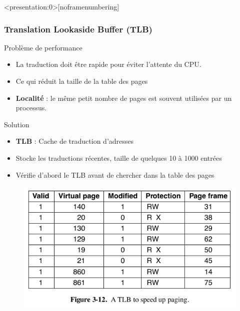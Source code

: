 \documentclass[8pt]{beamer}
\begin{document}
\begin{frame}<presentation:0>[noframenumbering]
    \frametitle{Translation Lookaside Buffer (TLB)}

    \begin{alertblock}{Problème de performance}
        \begin{itemize}
            \item La traduction doit \^etre rapide pour \'eviter
                  l'attente du
                  CPU.
            \item Ce qui r\'eduit la taille de la table des pages
            \item \textbf{Localité} : le même petit nombre de pages est souvent
                  utilisées par un processus.
        \end{itemize}
    \end{alertblock}
    \begin{exampleblock}{Solution}
        \begin{itemize}
            \item \textbf{TLB} : Cache de traduction d'adresses
            \item Stocke les traductions récentes, taille de quelques 10 à 1000
                  entrées
            \item Vérifie d'abord le TLB avant de chercher dans la table des
                  pages
        \end{itemize}
    \end{exampleblock}

    \begin{figure}
        \centering
        \includegraphics[width=.35\textwidth]{figures/TLB.png}
    \end{figure}
\end{frame}
\end{document}
